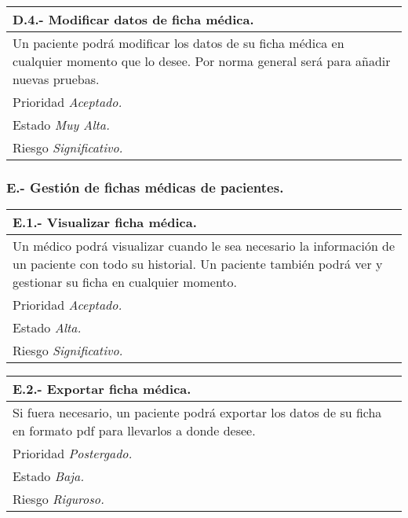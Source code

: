 \documentclass[a4paper,oneside,11pt]{book}
\begin{document}
\begin{center}
\begin{tabulary}{15cm}{|L|}
	\hline
		\bf{D.4.- Modificar datos de ficha médica.} \\
	\hline
		Un paciente podrá modificar los datos de su ficha médica en cualquier momento que lo desee. Por norma general será para añadir nuevas pruebas. \\
	\hline
		Prioridad \textit{Aceptado.} \\
	\hline
		Estado \textit{Muy Alta.} \\
	\hline
		Riesgo \textit{Significativo.} \\
	\hline
\end{tabulary}
\end{center}

\subsubsection{E.- Gestión de fichas médicas de pacientes.}

\begin{center}
\begin{tabulary}{15cm}{|L|}
	\hline
		\bf{E.1.- Visualizar ficha médica.} \\
	\hline
		Un médico podrá visualizar cuando le sea necesario la información de un paciente con todo su historial. Un paciente también podrá ver y gestionar su ficha en cualquier momento. \\
	\hline
		Prioridad \textit{Aceptado.} \\
	\hline
		Estado \textit{Alta.} \\
	\hline
		Riesgo \textit{Significativo.} \\
	\hline
\end{tabulary}
\end{center}

\begin{center}
\begin{tabulary}{15cm}{|L|}
	\hline
		\bf{E.2.- Exportar ficha médica.} \\
	\hline
		Si fuera necesario, un paciente podrá exportar los datos de su ficha en formato pdf para llevarlos a donde desee. \\
	\hline
		Prioridad \textit{Postergado.} \\
	\hline
		Estado \textit{Baja.} \\
	\hline
		Riesgo \textit{Riguroso.} \\
	\hline
\end{tabulary}
\end{center}
\end{document}

